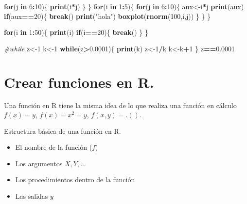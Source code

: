 \documentclass[
]{book}
\newenvironment{Shaded}{\begin{snugshade}}{\end{snugshade}}
\newcommand{\CommentTok}[1]{\textcolor[rgb]{0.56,0.35,0.01}{\textit{#1}}}
\newcommand{\ControlFlowTok}[1]{\textcolor[rgb]{0.13,0.29,0.53}{\textbf{#1}}}
\newcommand{\DecValTok}[1]{\textcolor[rgb]{0.00,0.00,0.81}{#1}}
\newcommand{\FloatTok}[1]{\textcolor[rgb]{0.00,0.00,0.81}{#1}}
\newcommand{\KeywordTok}[1]{\textcolor[rgb]{0.13,0.29,0.53}{\textbf{#1}}}
\newcommand{\NormalTok}[1]{#1}
\newcommand{\OperatorTok}[1]{\textcolor[rgb]{0.81,0.36,0.00}{\textbf{#1}}}
\newcommand{\StringTok}[1]{\textcolor[rgb]{0.31,0.60,0.02}{#1}}
\providecommand{\tightlist}{%
  \setlength{\itemsep}{0pt}\setlength{\parskip}{0pt}}
\begin{document}
\begin{Shaded}
\begin{Highlighting}[]
  \ControlFlowTok{for}\NormalTok{(j }\ControlFlowTok{in} \DecValTok{6}\OperatorTok{:}\DecValTok{10}\NormalTok{)\{}
    \KeywordTok{print}\NormalTok{(i}\OperatorTok{*}\NormalTok{j)}
\NormalTok{  \}}
\NormalTok{\}}
\ControlFlowTok{for}\NormalTok{(i }\ControlFlowTok{in} \DecValTok{1}\OperatorTok{:}\DecValTok{5}\NormalTok{)\{}
  \ControlFlowTok{for}\NormalTok{(j }\ControlFlowTok{in} \DecValTok{6}\OperatorTok{:}\DecValTok{10}\NormalTok{)\{}
\NormalTok{    aux<-i}\OperatorTok{*}\NormalTok{j}
    \KeywordTok{print}\NormalTok{(aux)}
    \ControlFlowTok{if}\NormalTok{(aux}\OperatorTok{==}\DecValTok{20}\NormalTok{)\{}
      \ControlFlowTok{break}\NormalTok{()}
      \KeywordTok{print}\NormalTok{(}\StringTok{"hola"}\NormalTok{)}
      \KeywordTok{boxplot}\NormalTok{(}\KeywordTok{rnorm}\NormalTok{(}\DecValTok{100}\NormalTok{,i,j))}
\NormalTok{    \}}
\NormalTok{  \}}
\NormalTok{\}}

\ControlFlowTok{for}\NormalTok{(i }\ControlFlowTok{in} \DecValTok{1}\OperatorTok{:}\DecValTok{50}\NormalTok{)\{}
  \KeywordTok{print}\NormalTok{(i)}
  \ControlFlowTok{if}\NormalTok{(i}\OperatorTok{==}\DecValTok{20}\NormalTok{)\{}
    \ControlFlowTok{break}\NormalTok{()}
\NormalTok{  \}}
\NormalTok{\}}

\CommentTok{#while}
\NormalTok{z<-}\DecValTok{1}
\NormalTok{k<-}\DecValTok{1}
\ControlFlowTok{while}\NormalTok{(z}\OperatorTok{>}\FloatTok{0.0001}\NormalTok{)\{}
  \KeywordTok{print}\NormalTok{(k)}
\NormalTok{  z<-}\DecValTok{1}\OperatorTok{/}\NormalTok{k}
\NormalTok{  k<-k}\OperatorTok{+}\DecValTok{1}
\NormalTok{\}}
\NormalTok{z}\OperatorTok{==}\FloatTok{0.0001}
\end{Highlighting}
\end{Shaded}

\hypertarget{crear-funciones-en-r.}{%
\section{Crear funciones en R.}\label{crear-funciones-en-r.}}

Una función en R tiene la misma idea de lo que realiza una función en cálculo \(f(x)=y\), \(f(x)=x^2=y\), \(f(x,y)=.()\).

Estructura básica de una función en R.

\begin{itemize}
\tightlist
\item
  El nombre de la función (\(f\))
\item
  Los argumentos \(X,Y,\ldots\)
\item
  Los procedimientos dentro de la función
\item
  Las salidas \(y\)
\end{itemize}
\end{document}
